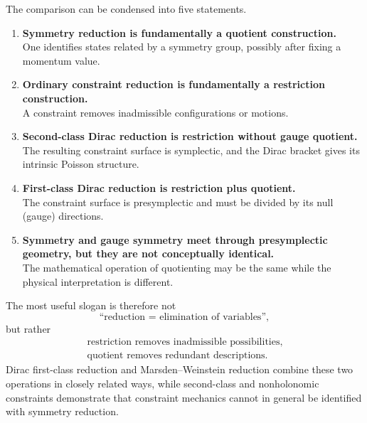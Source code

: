 The comparison can be condensed into five statements.
\begin{enumerate}
\item \textbf{Symmetry reduction is fundamentally a quotient construction.}\\
One identifies states related by a symmetry group, possibly after fixing a
momentum value.
\item \textbf{Ordinary constraint reduction is fundamentally a restriction
construction.}\\
A constraint removes inadmissible configurations or motions.
\item \textbf{Second-class Dirac reduction is restriction without gauge
quotient.}\\
The resulting constraint surface is symplectic, and the Dirac bracket gives
its intrinsic Poisson structure.
\item \textbf{First-class Dirac reduction is restriction plus quotient.}\\
The constraint surface is presymplectic and must be divided by its null
(gauge) directions.
\item \textbf{Symmetry and gauge symmetry meet through presymplectic
geometry, but they are not conceptually identical.}\\
The mathematical operation of quotienting may be the same while the physical
interpretation is different.
\end{enumerate}

The most useful slogan is therefore not
\[
        \text{``reduction = elimination of variables''},
\]
but rather
\[
\boxed{
\begin{array}{c}
\text{restriction removes inadmissible possibilities},\\[2mm]
\text{quotient removes redundant descriptions}.
\end{array}}
\]
Dirac first-class reduction and Marsden--Weinstein reduction combine these
two operations in closely related ways, while second-class and nonholonomic
constraints demonstrate that constraint mechanics cannot in general be
identified with symmetry reduction.

